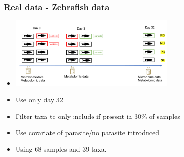 \documentclass{beamer}
\begin{document}
\begin{frame}
\frametitle{Real data - Zebrafish data}
\begin{itemize}
  \item
	\includegraphics[width=0.65\textwidth]{img/2022_April_11_Research_Update-f2887a67.png}
  \item Use only day 32
  \item Filter taxa to only include if present in 30\% of samples
  \item Use covariate of parasite/no parasite introduced
  \item Using 68 samples and 39 taxa.
\end{itemize}
\end{frame}
\end{document}

